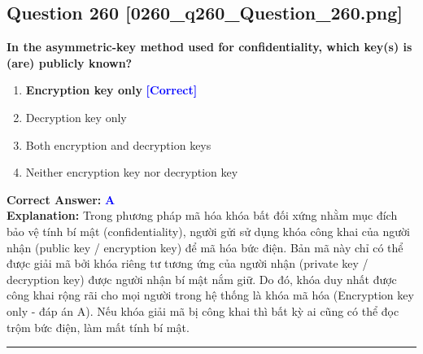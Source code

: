 \documentclass[11pt,a4paper]{article}
\begin{document}
\begin{minipage}{\textwidth}
\subsection*{Question 260 \quad \footnotesize{[0260\_q260\_Question\_260.png]}}
\noindent \textbf{In the asymmetric-key method used for confidentiality, which key(s) is (are) publicly known?}

\begin{enumerate}[label=\Alph*.]
    \item \textbf{Encryption key only} \hfill \textcolor{blue}{\textbf{[Correct]}}
    \item Decryption key only
    \item Both encryption and decryption keys
    \item Neither encryption key nor decryption key
\end{enumerate}

\noindent \textbf{Correct Answer:} \textcolor{blue}{\textbf{A}} \\[2pt]
\noindent \textbf{Explanation:} Trong phương pháp mã hóa khóa bất đối xứng nhằm mục đích bảo vệ tính bí mật (confidentiality), người gửi sử dụng khóa công khai của người nhận (public key / encryption key) để mã hóa bức điện. Bản mã này chỉ có thể được giải mã bởi khóa riêng tư tương ứng của người nhận (private key / decryption key) được người nhận bí mật nắm giữ. Do đó, khóa duy nhất được công khai rộng rãi cho mọi người trong hệ thống là khóa mã hóa (Encryption key only - đáp án A). Nếu khóa giải mã bị công khai thì bất kỳ ai cũng có thể đọc trộm bức điện, làm mất tính bí mật.

\par\vspace{0.3cm}
\hrule
\vspace{0.3cm}
\end{minipage}
\end{document}
